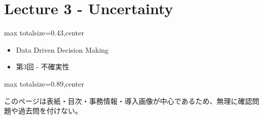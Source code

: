 \section*{Lecture 3 - Uncertainty}

\clearpage
{}
\begin{minipage}[t]{0.405\textwidth}
\begin{adjustbox}{max totalsize={\textwidth}{0.43\textheight},center}
\begin{minipage}{\textwidth}\scriptsize
{}\begin{itemize}
\item Data Driven Decision Making
\item 第3回 - 不確実性
\end{itemize}
\end{minipage}
\end{adjustbox}
\end{minipage}\hfill
\begin{minipage}[t]{0.58\textwidth}
\begin{adjustbox}{max totalsize={\textwidth}{0.89\textheight},center}
\begin{minipage}{\textwidth}\scriptsize
{}このページは表紙・目次・事務情報・導入画像が中心であるため、無理に確認問題や過去問を付けない。
\end{minipage}
\end{adjustbox}
\end{minipage}


